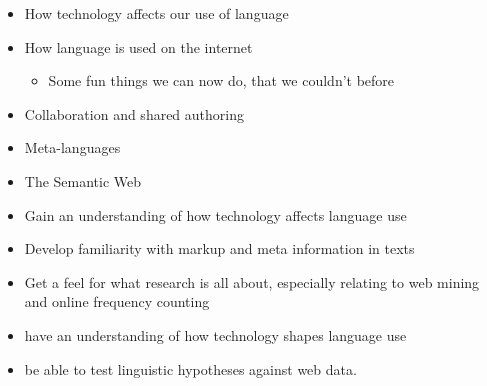 \documentclass[a4paper,landscape,headrule,footrule,xetex]{foils}
\begin{document}
\maketitle



\begin{itemize}
\item How technology affects our use of language
 \item How language is used on the internet
   \begin{itemize}
   \item Some fun things we can now do, that we couldn't before 
   \end{itemize}
 \item Collaboration and shared authoring
 \item Meta-languages
 \item The Semantic Web
\end{itemize}


\begin{itemize}
\item Gain an understanding of how technology affects language use
\item Develop familiarity with markup and meta information in texts
\item Get a feel for what research is all about, especially relating to
  web mining and online frequency counting
\end{itemize}
\begin{itemize}
\item have an understanding of how technology shapes language use
\item be able to test linguistic hypotheses against web data.
\end{itemize}



\end{document}
